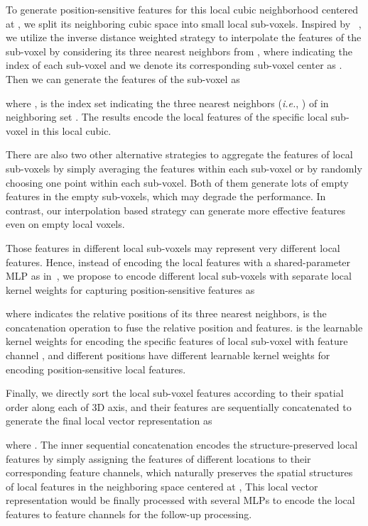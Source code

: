 \documentclass[natbib,twocolumn]{svjour3}          \smartqed  \usepackage{graphicx}
\begin{document}
To generate position-sensitive features for this local cubic neighborhood centered at , we split its neighboring cubic space 
into  small local sub-voxels.
Inspired by ~\citep{qi2017pointnet++}, 
we utilize the inverse distance weighted strategy to interpolate the features of the  sub-voxel by considering its three nearest neighbors from , where  indicating the index of each sub-voxel and we denote its corresponding sub-voxel center as . 
Then we can generate the features of the  sub-voxel as 
 
where ,  is the index set indicating the three nearest neighbors (\emph{i.e.}, ) of  in neighboring set .
The results  encode the local features of the specific  local sub-voxel in this local cubic.

There are also two other alternative strategies to aggregate the features of local sub-voxels by simply averaging the features within each sub-voxel or by randomly choosing one point within each sub-voxel. Both of them generate lots of empty features in the empty sub-voxels, which may degrade the performance. In contrast, our interpolation based strategy can generate more effective features even on empty local voxels. 


Those features in different local sub-voxels may represent very different local features. 
Hence, instead of encoding the local features with a shared-parameter MLP as in~\citep{qi2017pointnet++}, we propose to encode different local sub-voxels with separate local kernel weights for capturing position-sensitive features as 

where  indicates the relative positions of its three nearest neighbors,  is the concatenation operation to fuse the relative position and features. 
  is the learnable kernel weights for encoding the specific features of  local sub-voxel with feature channel , and different positions have different learnable kernel weights for encoding position-sensitive local features.

Finally, we directly sort the local sub-voxel features  according to their spatial order along each of 3D axis, and their features are sequentially concatenated to generate the final local vector representation as

where . The inner sequential concatenation encodes the structure-preserved local features by simply assigning the features of different locations to their corresponding feature channels, which naturally preserves the spatial structures of local features in the neighboring space centered at , 
This local vector representation would be finally processed with several MLPs to encode the local features to  feature channels for the follow-up processing. 
\end{document}
